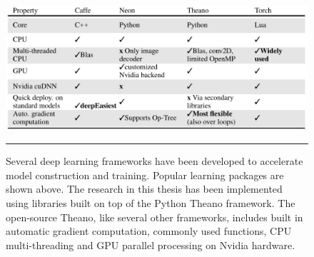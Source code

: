 \begin{figure}[htbp]
	\centering
		\includegraphics[width = 1.0\textwidth]{./Figures/theano_comparatives_study_of_cafe_neo_theano.jpg}
		\rule{35em}{0.5pt}
	\caption[Deep Learning Frameworks]{Several deep learning frameworks have been developed to accelerate model construction and training. Popular learning packages are shown above. The research in this thesis has been implemented using libraries built on top of the Python Theano framework. The open-source Theano, like several other frameworks, includes built in automatic gradient computation, commonly used functions, CPU multi-threading and GPU parallel processing on Nvidia hardware\citep{2016arXiv160502688short}.}
	\label{fig:Theano}
\end{figure}

